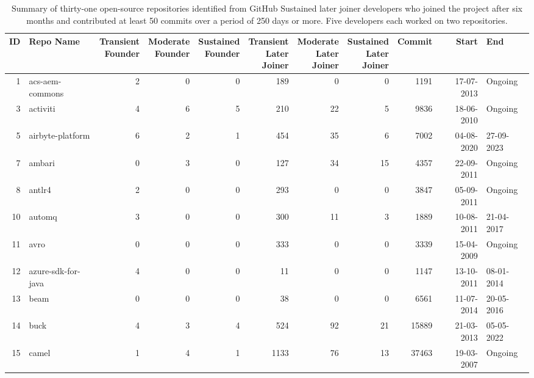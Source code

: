 \begin{landscape}
\begin{table}[H]
\centering
\setlength{\tabcolsep}{2pt}
\caption[Summary of OOS GitHub Repositories]{Summary of thirty-one open-source repositories identified from GitHub Sustained later joiner developers who joined the project after six months and contributed at least 50 commits over a period of 250 days or more. Five developers each worked on two repositories. }
\begin{tabular}{rlrrrrrrrrl}
\toprule
\textbf{ID} & \textbf{Repo Name} & \makecell[t]{\textbf{Transient}\\\textbf{Founder}} & \makecell[t]{\textbf{Moderate}\\\textbf{Founder}} & \makecell[t]{\textbf{Sustained}\\\textbf{Founder}} & \makecell[t]{\textbf{Transient}\\\textbf{Later}\\\textbf{Joiner}} & \makecell[t]{\textbf{Moderate}\\\textbf{Later}\\\textbf{Joiner}} & \makecell[t]{\textbf{Sustained}\\\textbf{Later}\\\textbf{Joiner}} & \textbf{Commit} & \textbf{Start} & \textbf{End} \\ 
\midrule
1 & acs-aem-commons & 2 & 0 & 0 & 189 & 0 & 0 & 1191 & 17-07-2013 & Ongoing \\ 
3 & activiti & 4 & 6 & 5 & 210 & 22 & 5 & 9836 & 18-06-2010 & Ongoing \\ 
5 & airbyte-platform & 6 & 2 & 1 & 454 & 35 & 6 & 7002 & 04-08-2020 & 27-09-2023 \\ 
7 & ambari & 0 & 3 & 0 & 127 & 34 & 15 & 4357 & 22-09-2011 & Ongoing \\ 
8 & antlr4 & 2 & 0 & 0 & 293 & 0 & 0 & 3847 & 05-09-2011 & Ongoing \\ 
10 & automq & 3 & 0 & 0 & 300 & 11 & 3 & 1889 & 10-08-2011 & 21-04-2017 \\ 
11 & avro & 0 & 0 & 0 & 333 & 0 & 0 & 3339 & 15-04-2009 & Ongoing \\ 
12 & azure-sdk-for-java & 4 & 0 & 0 & 11 & 0 & 0 & 1147 & 13-10-2011 & 08-01-2014 \\ 
13 & beam & 0 & 0 & 0 & 38 & 0 & 0 & 6561 & 11-07-2014 & 20-05-2016 \\ 
14 & buck & 4 & 3 & 4 & 524 & 92 & 21 & 15889 & 21-03-2013 & 05-05-2022 \\ 
15 & camel & 1 & 4 & 1 & 1133 & 76 & 13 & 37463 & 19-03-2007 & Ongoing \\ 

\end{tabular}
\end{table}
\end{landscape}
